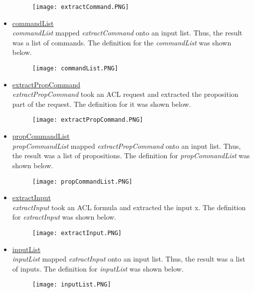 \begin{itemize}
  \begin{figure}[h]
  \centering
  \texttt{[image: extractCommand.PNG]}
\end{figure}

 \item \underline{commandList}\\
  \textit{commandList} mapped \textit{extractCommand} onto an input list.  Thus, the result was a list of
  commands.  The definition for the \textit{commandList} was shown below.\\
  
  \begin{figure}[h]
  \centering
  \texttt{[image: commandList.PNG]}
\end{figure}

 \item \underline{extractPropCommand}\\
  \textit{extractPropCommand} took an ACL request and extracted the proposition part of the request.
  The definition for it was shown below.\\
  \begin{figure}[h]
  \centering
  \texttt{[image: extractPropCommand.PNG]}
\end{figure}

\item \underline{propCommandList}\\
  \textit{propCommandList} mapped \textit{extractPropCommand} onto an input list.  Thus, the result was a list of
  propositions.  The definition for \textit{propCommandList} was shown below.\\
  \begin{figure}[h]
  \centering
  \texttt{[image: propCommandList.PNG]}
\end{figure}

 \item \underline{extractInput}\\
  \textit{extractInput} took an ACL formula and extracted the input x.   The definition for \textit{extractInput}
  was shown below.\\
  \begin{figure}[h]
  \centering
  \texttt{[image: extractInput.PNG]}
\end{figure}

 \item \underline{inputList}\\
  \textit{inputList} mapped \textit{extractInput} onto an input list.  Thus, the result was a list of inputs.
  The definition for \textit{inputList} was shown below.\\
  \begin{figure}[h!]
  \centering
  \texttt{[image: inputList.PNG]}
\end{figure}


\end{itemize}
